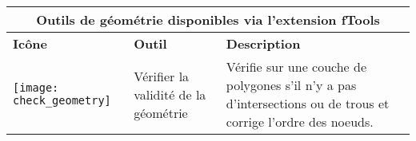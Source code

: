 \begin{table}[ht]
\centering
\begin{tabular}{|m{1cm}|m{3cm}|m{9cm}|}
 \hline \multicolumn{3}{|c|}{\textbf{Outils de géométrie disponibles via l'extension fTools}} \\
 \hline \textbf{Icône} & \textbf{Outil} & \textbf{Description} \\
 \hline \texttt{[image: check\_geometry]} & Vérifier la validité de la géométrie & Vérifie sur une couche de polygones s'il n'y a pas d'intersections ou de trous et corrige l'ordre des noeuds. \\

\end{tabular}
\end{table}
